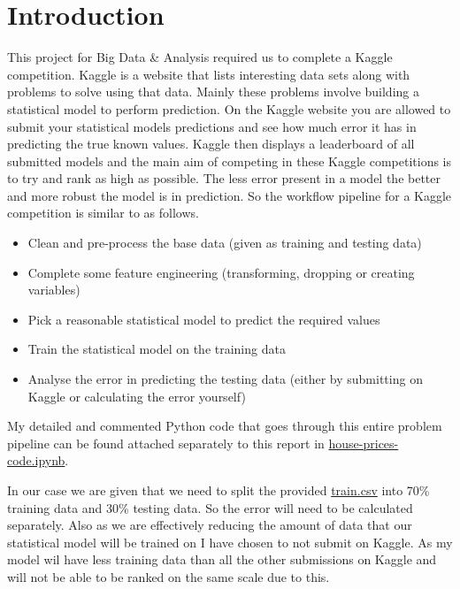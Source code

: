 \documentclass[a4paper]{article}
\begin{document}
\section{Introduction}
    This project for Big Data \& Analysis required us to complete a Kaggle competition. Kaggle is a website that lists interesting data sets along with problems to solve using that data. Mainly these problems involve building a statistical model to perform prediction. On the Kaggle website you are allowed to submit your statistical models predictions and see how much error it has in predicting the true known values. Kaggle then displays a leaderboard of all submitted models and the main aim of competing in these Kaggle competitions is to try and rank as high as possible. The less error present in a model the better and more robust the model is in prediction. So the workflow pipeline for a Kaggle competition is similar to as follows.
    \begin{itemize}
        \item Clean and pre-process the base data (given as training and testing data)
        \item Complete some feature engineering (transforming, dropping or creating variables)
        \item Pick a reasonable statistical model to predict the required values
        \item Train the statistical model on the training data
        \item Analyse the error in predicting the testing data (either by submitting on Kaggle or calculating the error yourself)
    \end{itemize}
    My detailed and commented Python code that goes through this entire problem pipeline can be found attached separately to this report in \href{https://github.com/HStuklis/my-projects/blob/master/house-prices/house-prices-code.ipynb}{house-prices-code.ipynb}.
    \par In our case we are given that we need to split the provided \href{https://github.com/HStuklis/my-projects/blob/master/house-prices/train.csv}{train.csv} into 70\% training data and 30\% testing data. So the error will need to be calculated separately. Also as we are effectively reducing the amount of data that our statistical model will be trained on I have chosen to not submit on Kaggle. As my model wil have less training data than all the other submissions on Kaggle and will not be able to be ranked on the same scale due to this.
\end{document}
